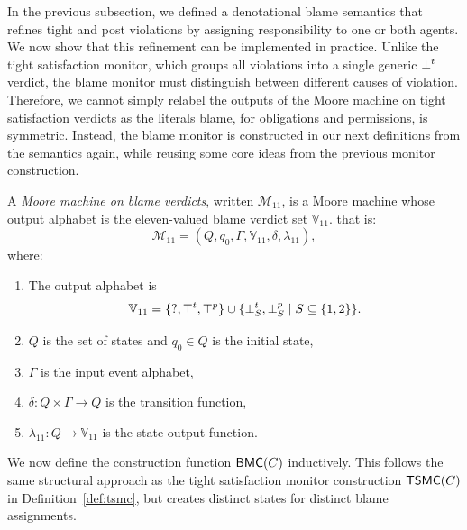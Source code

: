 In the previous subsection, we defined a denotational blame semantics that refines tight and post violations by assigning responsibility to one or both agents. We now show that this refinement can be implemented in practice.
Unlike the tight satisfaction monitor, which groups all violations into a single generic $\bot^t$ verdict, the blame monitor must distinguish between different causes of violation.
Therefore, we cannot simply relabel the outputs of the Moore machine on tight satisfaction verdicts as the literals blame, for obligations and permissions, is symmetric. Instead, the blame monitor is constructed in our next definitions from the semantics again, while reusing some core ideas from the previous monitor construction.

\begin{definition}
\label{def:blamemonitor}
A \emph{Moore machine on blame verdicts}, written $\mathcal{M}_{11}$, is a Moore machine whose output alphabet is the eleven-valued blame verdict set $\mathbb{V}_{11}$. that is:
\[
\mathcal{M}_{11} = (Q,q_0,\Gamma,\mathbb{V}_{11},\delta,\lambda_{11}),
\]
where:
\begin{enumerate}
  \item The output alphabet is
  \[
    \mathbb{V}_{11} = \{\mathsf{?},\top^t,\top^p\} \cup \{\bot^{t}_{S},\bot^{p}_{S} \mid S\subseteq \{1,2\}\}.
  \]
  \item $Q$ is the set of states and $q_0\in Q$ is the initial state,
  \item $\Gamma$ is the input event alphabet,
  \item $\delta: Q \times \Gamma \to Q$ is the transition function,
  \item $\lambda_{11}: Q \to \mathbb{V}_{11}$ is the state output function.
\end{enumerate}
\end{definition}

We now define the construction function $\mathsf{BMC}(C)$ inductively. This follows the same structural approach as the tight satisfaction monitor construction $\mathsf{TSMC}(C)$ in Definition~\ref{def:tsmc}, but creates distinct states for distinct blame assignments.

